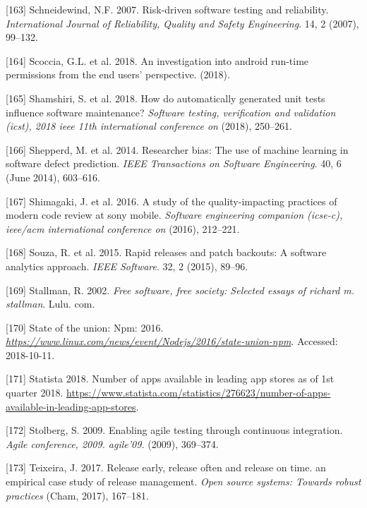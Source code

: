 \documentclass[]{book}
\begin{document}
\hypertarget{ref-schneidewind2007}{}
{[}163{]} Schneidewind, N.F. 2007. Risk-driven software testing and
reliability. \emph{International Journal of Reliability, Quality and
Safety Engineering}. 14, 2 (2007), 99--132.

\hypertarget{ref-scoccia2018investigation}{}
{[}164{]} Scoccia, G.L. et al. 2018. An investigation into android
run-time permissions from the end users' perspective. (2018).

\hypertarget{ref-shamshiri2018automatically}{}
{[}165{]} Shamshiri, S. et al. 2018. How do automatically generated unit
tests influence software maintenance? \emph{Software testing,
verification and validation (icst), 2018 ieee 11th international
conference on} (2018), 250--261.

\hypertarget{ref-Shepperd2014}{}
{[}166{]} Shepperd, M. et al. 2014. Researcher bias: The use of machine
learning in software defect prediction. \emph{IEEE Transactions on
Software Engineering}. 40, 6 (June 2014), 603--616.

\hypertarget{ref-shimagaki2016study}{}
{[}167{]} Shimagaki, J. et al. 2016. A study of the quality-impacting
practices of modern code review at sony mobile. \emph{Software
engineering companion (icse-c), ieee/acm international conference on}
(2016), 212--221.

\hypertarget{ref-souza2015a}{}
{[}168{]} Souza, R. et al. 2015. Rapid releases and patch backouts: A
software analytics approach. \emph{IEEE Software}. 32, 2 (2015), 89--96.

\hypertarget{ref-Stallman2002}{}
{[}169{]} Stallman, R. 2002. \emph{Free software, free society: Selected
essays of richard m. stallman}. Lulu. com.

\hypertarget{ref-Linux2016}{}
{[}170{]} State of the union: Npm: 2016.
\emph{\url{https://www.linux.com/news/event/Nodejs/2016/state-union-npm}}.
Accessed: 2018-10-11.

\hypertarget{ref-appNumber}{}
{[}171{]} Statista 2018. Number of apps available in leading app stores
as of 1st quarter 2018.
\url{https://www.statista.com/statistics/276623/number-of-apps-available-in-leading-app-stores}.

\hypertarget{ref-stolberg2009enabling}{}
{[}172{]} Stolberg, S. 2009. Enabling agile testing through continuous
integration. \emph{Agile conference, 2009. agile'09.} (2009), 369--374.

\hypertarget{ref-teixeira2017a}{}
{[}173{]} Teixeira, J. 2017. Release early, release often and release on
time. an empirical case study of release management. \emph{Open source
systems: Towards robust practices} (Cham, 2017), 167--181.
\end{document}
